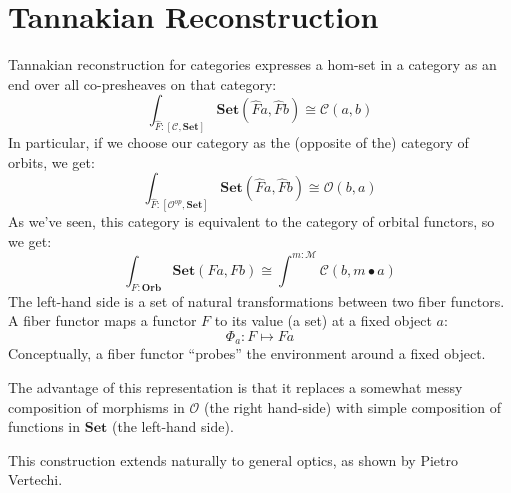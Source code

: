 \documentclass[11pt]{amsart}
\newcommand{\cat}[1]{\mathcal{#1}}%
\newcommand{\Cat}[1]{\mathbf{#1}}%
\newcommand{\Set}{\Cat{Set}}
\begin{document}
\section{Tannakian Reconstruction}

Tannakian reconstruction for categories expresses a hom-set in a category as an end over all co-presheaves on that category:
\[ \int_{\hat F \colon [\cat C, \Set]} \Set (\hat F a, \hat F b) \cong \cat C(a, b) \]
In particular, if we choose our category as the (opposite of the) category of orbits, we get:
\[ \int_{\hat F \colon [\cat O^{op}, \Set]} \Set (\hat F a, \hat F b) \cong \cat O(b, a) \]
As we've seen, this category is equivalent to the category of orbital functors, so we get:
\[ \int_{ F \colon \mathbf{Orb}} \Set (F a, F b) \cong \int^{m \colon \cat M} \cat C(b, m \bullet a) \]
The left-hand side is a set of natural transformations between two fiber functors. A fiber functor maps a functor $F$ to its value (a set) at a fixed object $a$:
\[ \Phi_a \colon F \mapsto F a \]
Conceptually, a fiber functor ``probes'' the environment around a fixed object. 

The advantage of this representation is that it replaces a somewhat messy composition of morphisms in $\cat O$ (the right hand-side) with simple composition of functions in $\Set$ (the left-hand side).

This construction extends naturally to general optics, as shown by Pietro Vertechi.
\end{document}
